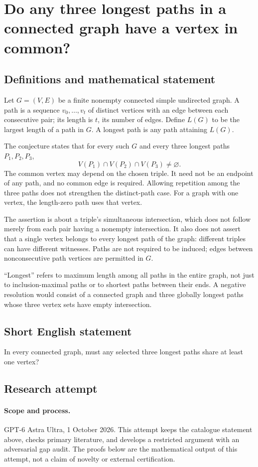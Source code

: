 \documentclass[11pt,a4paper]{article}
\begin{document}
\section*{Do any three longest paths in a connected graph have a vertex in common?}\label{statement}

\subsection{Definitions and mathematical statement}
Let $G=(V,E)$ be a finite nonempty connected simple undirected graph.
A path is a sequence $v_0,\ldots,v_t$ of distinct vertices with an edge
between each consecutive pair; its length is $t$, its number of edges.
Define $L(G)$ to be the largest length of a path in $G$.
A longest path is any path attaining $L(G)$.

The conjecture states that for every such $G$ and every three longest
paths $P_1,P_2,P_3$,
\[
 V(P_1)\cap V(P_2)\cap V(P_3)\ne\varnothing.
\]
The common vertex may depend on the chosen triple. It need not be an
endpoint of any path, and no common edge is required. Allowing repetition
among the three paths does not strengthen the distinct-path case.
For a graph with one vertex, the length-zero path uses that vertex.

The assertion is about a triple's simultaneous intersection, which does
not follow merely from each pair having a nonempty intersection. It also
does not assert that a single vertex belongs to every longest path of
the graph: different triples can have different witnesses. Paths are
not required to be induced; edges between nonconsecutive path vertices
are permitted in $G$.

``Longest'' refers to maximum length among all paths in the entire graph,
not just to inclusion-maximal paths or to shortest paths between their
ends. A negative resolution would consist of a connected graph and
three globally longest paths whose three vertex sets have empty
intersection.
\subsection{Short English statement}
In every connected graph, must any selected three longest paths share at least one vertex?
\subsection{Research attempt}
\paragraph{Scope and process.}
GPT-6 Astra Ultra, 1 October 2026. This attempt keeps the catalogue statement above, checks primary literature, and develops a restricted argument with an adversarial gap audit. The proofs below are the mathematical output of this attempt, not a claim of novelty or external certification.
\end{document}
